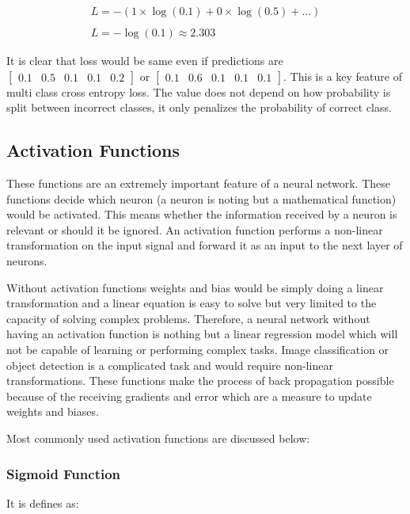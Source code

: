 \documentclass[11pt]{article}
\begin{document}
$$
\begin{array}{l}{L=-(1 \times \log (0.1)+0 \times \log (0.5)+\ldots)} \\\\ {L=-\log (0.1) \approx 2.303}\end{array}
$$

It is clear that loss would be same even if predictions are $\left[\begin{array}{llllll}{0.1} & {0.5} & {0.1} & {0.1} & {0.2}\end{array}\right]$ or $\left[\begin{array}{llllll}{0.1} & {0.6} & {0.1} & {0.1} & {0.1}\end{array}\right]$. This is a key feature of multi class cross entropy loss. The value does not depend on how probability is split between incorrect classes, it only penalizes the probability of correct class.  

\subsection{Activation Functions}
These functions are an extremely important feature of a neural network. These functions decide which neuron (a neuron is noting but a mathematical function) would be activated. This means whether the information received by a neuron is relevant or should it be ignored. An activation function performs a non-linear transformation on the input signal and forward it as an input to the next layer of neurons.

Without activation functions weights and bias would be simply doing a linear transformation and a linear equation is easy to solve but very limited to the capacity of solving complex problems. Therefore, a neural network without having an activation function is nothing but a linear regression model which will not be capable of learning or performing complex tasks. Image classification or object detection is a complicated task and would require non-linear transformations. These functions make the process of back propagation possible because of the receiving gradients and error which are a measure to update weights and biases.

Most commonly used activation functions are discussed below:

\subsubsection{Sigmoid Function}
It is defines as:
\end{document}
